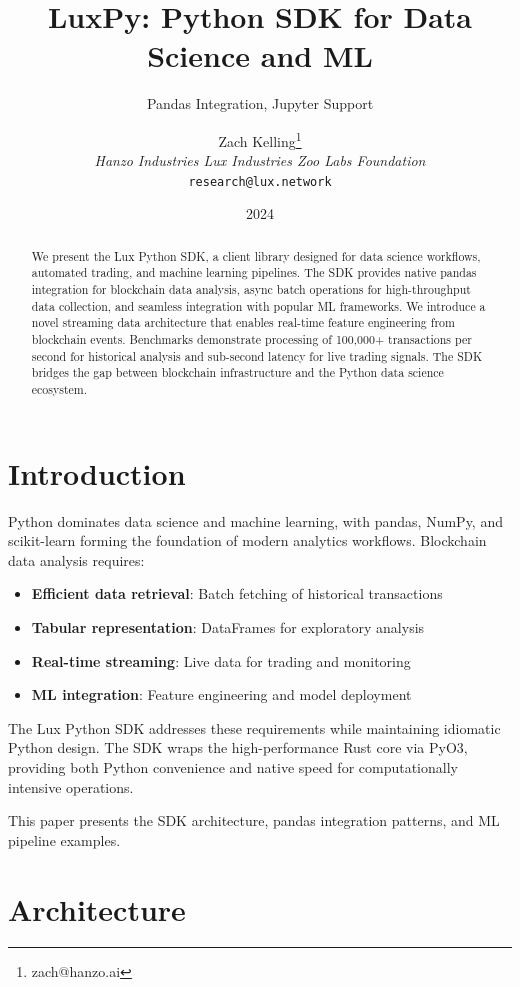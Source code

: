 \documentclass[11pt,twocolumn]{article}
\title{\textbf{LuxPy: Python SDK for Data Science and ML}}
\subtitle{Pandas Integration, Jupyter Support}
\author{Zach Kelling\thanks{zach@hanzo.ai} \\ \textit{Hanzo Industries \quad Lux Industries \quad Zoo Labs Foundation} \\ \texttt{research@lux.network}}
\date{2024}
\begin{document}
\maketitle

\begin{abstract}
We present the Lux Python SDK, a client library designed for data science workflows, automated trading, and machine learning pipelines. The SDK provides native pandas integration for blockchain data analysis, async batch operations for high-throughput data collection, and seamless integration with popular ML frameworks. We introduce a novel streaming data architecture that enables real-time feature engineering from blockchain events. Benchmarks demonstrate processing of 100,000+ transactions per second for historical analysis and sub-second latency for live trading signals. The SDK bridges the gap between blockchain infrastructure and the Python data science ecosystem.
\end{abstract}

\section{Introduction}

Python dominates data science and machine learning, with pandas, NumPy, and scikit-learn forming the foundation of modern analytics workflows. Blockchain data analysis requires:

\begin{itemize}
    \item \textbf{Efficient data retrieval}: Batch fetching of historical transactions
    \item \textbf{Tabular representation}: DataFrames for exploratory analysis
    \item \textbf{Real-time streaming}: Live data for trading and monitoring
    \item \textbf{ML integration}: Feature engineering and model deployment
\end{itemize}

The Lux Python SDK addresses these requirements while maintaining idiomatic Python design. The SDK wraps the high-performance Rust core via PyO3, providing both Python convenience and native speed for computationally intensive operations.

This paper presents the SDK architecture, pandas integration patterns, and ML pipeline examples.

\section{Architecture}
\end{document}
